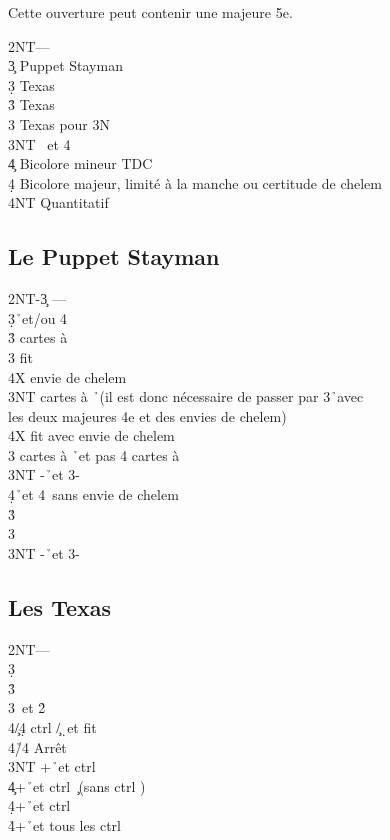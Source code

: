 \documentclass[a4paper]{article}
\begin{document}
Cette ouverture peut contenir une majeure 5e.

\begin{bidtable}
2NT---\\
3\c \> Puppet Stayman\\
3\d \> Texas \h \\
3\h \> Texas \s \\
3\s \> Texas pour 3N\\
3NT \s\ et 4\h \\
4\c \> Bicolore mineur TDC\\
4\d \> Bicolore majeur, limité à la manche ou certitude de chelem\\
4NT \> Quantitatif
\end{bidtable}

\subsection{Le Puppet Stayman}

\begin{bidtable}
2NT-3\c \> ---\\
3\d {}\h\ et/ou 4\s \+\\
3\h {} cartes à \s \+\\
3\s \> fit \s \+\\
4X \> envie de chelem\-\\
3NT  cartes à \h\ (il est donc nécessaire de passer par 3\h\ avec\\
\>les deux majeures 4e et des envies de chelem)\\
\>4X fit avec envie de chelem\-\\
3\s {} cartes à \h\ et pas 4 cartes à \s \\
3NT -\h\ et 3-\s \\
4\d {}\h\ et 4\s\ sans envie de chelem\-\\
3\h {}\h \\
3\s {}\s \\
3NT -\h\ et 3-\s 
\end{bidtable}

\subsection{Les Texas}

\begin{bidtable}
2NT---\\
3\d\+\\
3\h {}\h \\
3\s {}\s\ et 2\h \+\\
4\c/4\d \> ctrl \c /\d\ et fit \s \\
4\h/4\s \> Arrêt\-\\
3NT +\h\ et ctrl \s \\
4\c {}+\h\ et ctrl \c\ (sans ctrl \s )\\
4\d {}+\h\ et ctrl \d \\
4\h {}+\h\ et tous les ctrl\-
\end{bidtable}
\end{document}
